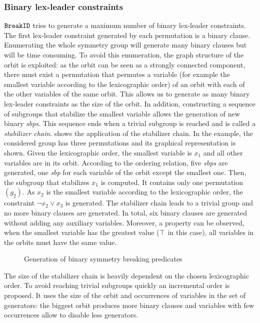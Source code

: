 \subsubsection{Binary lex-leader constraints}
$\texttt{BreakID}$ tries to generate a maximum number of binary lex-leader constraints.
The first lex-leader constraint generated by each permutation is a binary clause.
Enumerating the whole symmetry group will generate many binary clauses but will be time consuming.
To avoid this enumeration, the  graph structure  of the orbit is exploited: as the orbit can be seen as a strongly connected component, there must exist a permutation that permutes a variable (for example the smallest variable according to the lexicographic order) of an orbit with each of the other variables of the same orbit. This allows us to
generate as many binary lex-leader constraints as the size of the orbit. In addition, constructing 
a sequence of subgroups that stabilize the smallest variable allows the generation of new binary \textit{sbps}.
This sequence ends when a trivial subgroup is reached and is called a  \emph{stabilizer chain}.
 shows the application of the stabilizer chain.
In the example, the considered group has three permutations and its graphical representation
is shown. Given the lexicographic order, the smallest variable is $x_1$ and 
all other variables are in its orbit. According to the ordering relation, five 
\textit{sbps} are generated, one \textit{sbp} for each variable of the orbit except the smallest one.
Then, the subgroup that stabilizes $x_1$ is computed. It contains only one permutation $(g_2)$.
As $x_2$ is the smallest variable according to the lexicographic order, the constraint $\neg x_2 \lor x_3$ is generated. The stabilizer chain leads to a trivial group and no more binary clauses are generated.
In total, six binary clauses are generated without adding any auxiliary variables.
Moreover, a property can be observed, when the smallest variable has the greatest value 
($\top$ in this case), all variables in the orbits must have the same value.
 \begin{figure}[!htbp]
 
 \caption{Generation of binary symmetry breaking predicates}
 \label{fig:binary_sbp}
\end{figure}
The size of the stabilizer chain is heavily dependent on the chosen lexicographic order.
To avoid reaching trivial subgroups quickly an incremental order is proposed.
It uses the size of the orbit and occurrences of variables in the set of generators:
the biggest orbit produces more binary clauses and variables with few occurrences allow to disable less generators.

